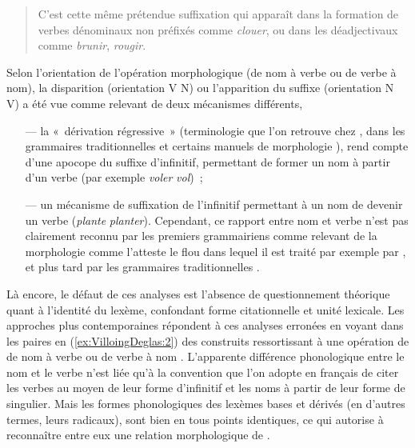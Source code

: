 \documentclass[output=paper]{langsci/langscibook}
\begin{document}
\begin{quote} C'est cette même prétendue suffixation qui apparaît dans la formation
de verbes dénominaux non préfixés comme \emph{clouer}, ou dans les
déadjectivaux comme \emph{brunir}, \emph{rougir}. %
\citep[200--202]{Dell70}%
%
~
\end{quote}

Selon l'orientation de l'opération morphologique (de nom à verbe ou de
verbe à nom), la disparition (orientation V \textrightarrow{~} N) ou l'apparition du
suffixe (orientation N \textrightarrow{~} V) a été vue comme relevant de deux mécanismes
différents,

\begin{itemize}

\item[---]
  la «~dérivation régressive~» (terminologie que l'on retrouve chez
\citet{Nyrop36}%
%
, dans les grammaires traditionnelles %
\citep{Grevisse1988} %
%
et
  certains manuels de morphologie %
\citep{Gardes-Tamine1988}%
%  
), rend compte
  d'une apocope du suffixe d'infinitif, permettant de former un nom à
  partir d'un verbe (par exemple \emph{voler} \textrightarrow{~} \emph{vol})~;
\item[---]
  un mécanisme de suffixation de l'infinitif permettant à un nom de
  devenir un verbe (\emph{plante} \textrightarrow{~} \emph{planter}). Cependant, ce
  rapport entre nom et verbe n'est pas clairement reconnu par les
  premiers grammairiens comme relevant de la morphologie comme l'atteste
  le flou dans lequel il est traité par exemple par %
\citet{Nyrop36}, %
%
%
\citet{Meyer-Lubke} %
%
et plus tard par les grammaires traditionnelles
%
\citep[cf. par exemple][238]{Grevisse1988}%
%
.
\end{itemize}

Là encore, le défaut de ces analyses est l'absence de questionnement
théorique quant à l'identité du lexème, confondant forme citationnelle
et unité lexicale. Les approches plus contemporaines répondent à ces
analyses erronées en voyant dans les paires en (\ref{ex:VilloingDeglas:2}) des construits
ressortissant à une opération de  de nom à verbe ou de verbe à
nom %
\citep[cf. pour le français,][]{Corbin87,corbin04,Melcuk1996,Kerleroux2000,Fradin03,Namer09,Tribout2010a}%
%
. L'apparente différence
phonologique entre le nom et le verbe n'est liée qu'à la convention que
l'on adopte en français de citer les verbes au moyen de leur forme
d'infinitif et les noms à partir de leur forme de singulier. Mais les
formes phonologiques des lexèmes bases et dérivés (en d'autres termes,
leurs radicaux), sont bien en tous points identiques, ce qui autorise à
reconnaître entre eux une relation morphologique de .
\end{document}

